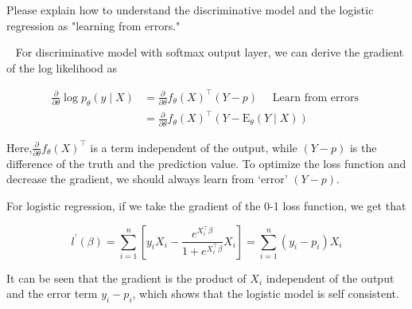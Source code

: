 \begin{exercise}[]{Please explain how to understand the discriminative model and the logistic regression as "learning from errors."}
  \begin{solution}
  \par{~}
    For discriminative model with softmax output layer, we can derive the gradient of the log likelihood as

  \begin{equation}
    \begin{aligned}
    \frac{\partial}{\partial \theta} \log p_{\theta}(y \mid X) &=\frac{\partial}{\partial \theta} f_{\theta}(X)^{\top}(Y-p) \quad \text { Learn from errors } \\
    &=\frac{\partial}{\partial \theta} f_{\theta}(X)^{\top}\left(Y-\mathrm{E}_{\theta}(Y \mid X)\right)
    \end{aligned}
  \end{equation}

  Here,$\frac{\partial}{\partial \theta}f_{\theta}(X)^{\top}$ is a term independent of the output, while $(Y - p)$ is the difference of the truth and the prediction value. To optimize the loss function and decrease the gradient, we should always learn from `error'  $(Y - p)$.

  For logistic regression, if we take the gradient of the 0-1 loss function, we get that

  \begin{equation}
    l^{\prime}(\beta)=\sum_{i=1}^{n}\left[y_{i} X_{i}-\frac{e^{X_{i}^{\top} \beta}}{1+e^{X_{i}^{\top} \beta}} X_{i}\right]=\sum_{i=1}^{n}\left(y_{i}-p_{i}\right) X_{i}
  \end{equation}

  It can be seen that the gradient is the product of $X_i$ independent of the output and the error term $y_i - p_i$, which shows that the logistic model is self consistent.
  \end{solution}
  \label{ex2}
\end{exercise}


